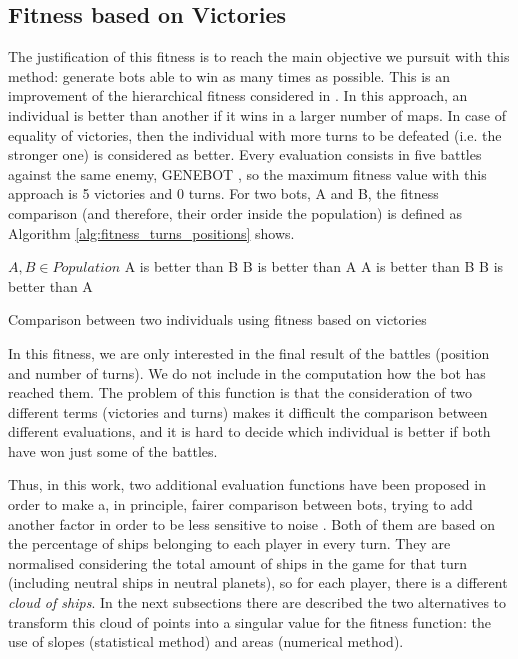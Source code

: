 \documentclass[preprint]{elsarticle}
\begin{document}

\subsection{Fitness based on Victories}
\label{subsec:fitness_turns}

The justification of this fitness is to reach the main objective we pursuit with this method: generate bots able to win as many times as possible.
This is an improvement of the hierarchical fitness considered in \cite{Genebot_CEC11}.
In this approach, an individual is better than another if it wins in a larger number of maps. In case of equality of victories, then the individual with more turns to be defeated (i.e. the stronger one) is considered as better. 
Every evaluation consists in five battles against the same enemy, GENEBOT
 \cite{Genebot_CEC11}, so the maximum fitness value with this approach is 5 victories and 0 turns. 
For two bots, A and B, the fitness comparison (and therefore, their order inside the population) is defined as Algorithm \ref{alg:fitness_turns_positions} shows.

\begin{algorithm}[ht]
\begin{algorithmic}
        
\STATE $A,B \in Population$
		\STATE A is better than B
	\ELSE
		\STATE B is better than A
	\ENDIF
\ELSE
		\STATE A is better than B
	\ELSE
		\STATE B is better than A
	\ENDIF
\ENDIF

\end{algorithmic}
\caption{Comparison between two individuals using fitness based on victories}
\label{alg:fitness_turns_positions}
\end{algorithm}

In this fitness, we are only interested in the final result of the battles (position and number of turns). We do not include in the computation how the bot has reached them. The problem of this function is that the consideration of two different terms (victories and turns) makes it difficult the comparison between different evaluations, and it is hard to decide which individual is better if both have won just some of the battles. 

Thus, in this work, two additional evaluation functions have been proposed in order to make a, in principle, fairer comparison between bots, trying to add another factor in order to be less sensitive to noise \cite{Mora_noisy_jcst}. 
Both of them are based on the percentage of ships belonging to each player in every turn. They are normalised considering the total amount of ships in the game for that turn (including neutral ships in neutral planets), so for each player, there is a different {\em cloud of ships}.
In the next subsections there are described the two alternatives to transform this cloud of points into a singular value for the fitness function: the use of slopes (statistical method) and areas (numerical method).
\end{document}
